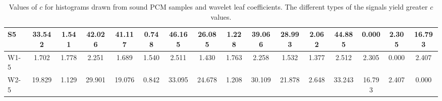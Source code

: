 \begin{table*}[h!]
\begin{center}
\begin{tabular}{| l | c | c | c | c | c | c | c | c | c | c | c | c | c | c | c |}
S5 & 33.542  & 1.541  & 42.026  & 41.117  & 0.748  & 46.165  & 26.085  & 1.228  & 39.066  & 28.993  & 2.062  & 44.885  & 0.000  & 2.305  & 16.793 \\\hline
W1-5 & 1.702  & 1.778  & 2.251  & 1.689  & 1.540  & 2.511  & 1.430  & 1.763  & 2.258  & 1.532  & 1.377  & 2.512  & 2.305  & 0.000  & 2.407 \\\hline
W2-5 & 19.829  & 1.129  & 29.901  & 19.076  & 0.842  & 33.095  & 24.678  & 1.208  & 30.109  & 21.878  & 2.648  & 33.243  & 16.793  & 2.407  & 0.000 \\\hline
\end{tabular}
\caption{Values of $c$ for histograms drawn from sound PCM samples and wavelet leaf coefficients.
The different types of the signals yield greater $c$ values.}
\end{center}
\end{table*}